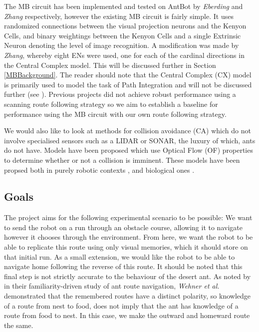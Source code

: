 \documentclass[a4paper,11pt,twoside,openright]{article}
\begin{document}
The MB circuit has been implemented and tested on AntBot by \textit{Eberding} and \textit{Zhang} respectively, however
the existing MB circuit is fairly simple. It uses randomized connections between
the visual projection neurons and the Kenyon Cells, and binary weightings between the Kenyon Cells
and a single Extrinsic Neuron denoting the level of
image recognition. A modification was made by \textit{Zhang}, whereby eight ENs were used, one for each of
the cardinal directions in the Central Complex model. This will be discussed further in Section
\ref{MBBackground}. The reader should note that the Central Complex (CX) model is primarily used
to model the task of Path Integration and will not be discussed further (see \cite{Scimeca2017}).
Previous projects did not achieve robust performance using a scanning route following strategy so we
aim to establish a baseline for performance using the MB circuit with our own route following strategy.
\newline

We would also like to look at methods for collision avoidance (CA) which do not involve specialised
sensors such as a LIDAR or SONAR, the luxury of which, ants do not have. Models have been proposed
which use Optical Flow (OF) properties to determine whether or not a collision is imminent. These
models have been propsed both in purely robotic contexts \cite{Souhila2007},
and biological ones \cite{Low2005}. 
  
\subsection { Goals }

The project aims for the following experimental scenario to be possible: We want to send the robot
on a run through an obstacle course, allowing it to navigate however it chooses through the
environment. From here, we want the robot to be able to replicate this route using only visual
memories, which it should store on that initial run. As a small extension, we would like the robot to be able to 
navigate home following the reverse of this route. It should be noted that this final step is not
strictly accurate to the behaviour of the desert ant. As noted by \cite{Baddeley2012} in their
familiarity-driven study of ant route navigation, \textit{Wehner et al.} \cite{Wehner2006}
demonstrated that the remembered routes have a distinct polarity, so knowledge of a route from
nest to food, does not imply that the ant has knowledge of a route from food to nest. In this case,
we make the outward and homeward route the same.
\newline
\end{document}
